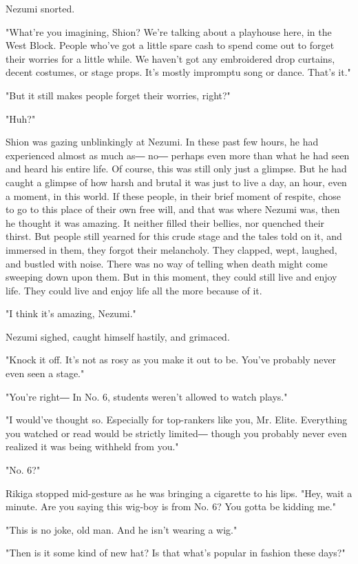 Nezumi snorted.

"What're you imagining, Shion? We're talking about a playhouse here, in
the West Block. People who've got a little spare cash to spend come out
to forget their worries for a little while. We haven't got any
embroidered drop curtains, decent costumes, or stage props. It's mostly
impromptu song or dance. That's it."

"But it still makes people forget their worries, right?"

"Huh?"

Shion was gazing unblinkingly at Nezumi. In these past few hours, he had
experienced almost as much as― no― perhaps even more than what he had
seen and heard his entire life. Of course, this was still only just a
glimpse. But he had caught a glimpse of how harsh and brutal it was just
to live a day, an hour, even a moment, in this world. If these people,
in their brief moment of respite, chose to go to this place of their own
free will, and that was where Nezumi was, then he thought it was
amazing. It neither filled their bellies, nor quenched their thirst. But
people still yearned for this crude stage and the tales told on it, and
immersed in them, they forgot their melancholy. They clapped, wept,
laughed, and bustled with noise. There was no way of telling when death
might come sweeping down upon them. But in this moment, they could still
live and enjoy life. They could live and enjoy life all the more because
of it.

"I think it's amazing, Nezumi."

Nezumi sighed, caught himself hastily, and grimaced.

"Knock it off. It's not as rosy as you make it out to be. You've
probably never even seen a stage."

"You're right― In No. 6, students weren't allowed to watch plays."

"I would've thought so. Especially for top-rankers like you, Mr. Elite.
Everything you watched or read would be strictly limited― though you
probably never even realized it was being withheld from you."

"No. 6?"

Rikiga stopped mid-gesture as he was bringing a cigarette to his lips.
"Hey, wait a minute. Are you saying this wig-boy is from No. 6? You
gotta be kidding me."

"This is no joke, old man. And he isn't wearing a wig."

"Then is it some kind of new hat? Is that what's popular in fashion
these days?"

